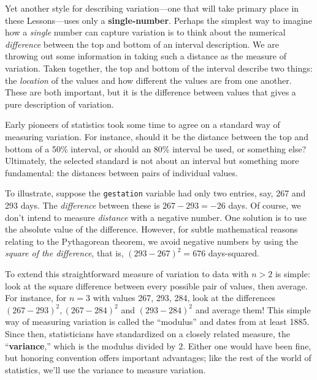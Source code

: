 \documentclass[
  letterpaper,
  DIV=11,
  numbers=noendperiod,
  oneside]{scrartcl}
\begin{document}
Yet another style for describing variation---one that will take primary
place in these Lessons---uses only a \textbf{single-number}. Perhaps the
simplest way to imagine how a \emph{single} number can capture variation
is to think about the numerical \emph{difference} between the top and
bottom of an interval description. We are throwing out some information
in taking such a distance as the measure of variation. Taken together,
the top and bottom of the interval describe two things: the
\emph{location} of the values and how different the values are from one
another. These are both important, but it is the difference between
values that gives a pure description of variation.

Early pioneers of statistics took some time to agree on a standard way
of measuring variation. For instance, should it be the distance between
the top and bottom of a 50\% interval, or should an 80\% interval be
used, or something else? Ultimately, the selected standard is not about
an interval but something more fundamental: the distances between pairs
of individual values.

To illustrate, suppose the \texttt{gestation} variable had only two
entries, say, 267 and 293 days. The \emph{difference} between these is
\(267-293 = -26\) days. Of course, we don't intend to measure
\emph{distance} with a negative number. One solution is to use the
absolute value of the difference. However, for subtle mathematical
reasons relating to the Pythagorean theorem, we avoid negative numbers
by using the \emph{square of the difference}, that is,
\((293 - 267)^2 = 676\) days-squared.

To extend this straightforward measure of variation to data with
\(n > 2\) is simple: look at the square difference between every
possible pair of values, then average. For instance, for \(n=3\) with
values 267, 293, 284, look at the differences
\((267-293)^2, (267-284)^2\) and \((293-284)^2\) and average them! This
simple way of measuring variation is called the ``modulus'' and dates
from at least 1885. Since then, statisticians have standardized on a
closely related measure, the ``\textbf{variance},'' which is the modulus
divided by \(2\). Either one would have been fine, but honoring
convention offers important advantages; like the rest of the world of
statistics, we'll use the variance to measure variation.
\end{document}
